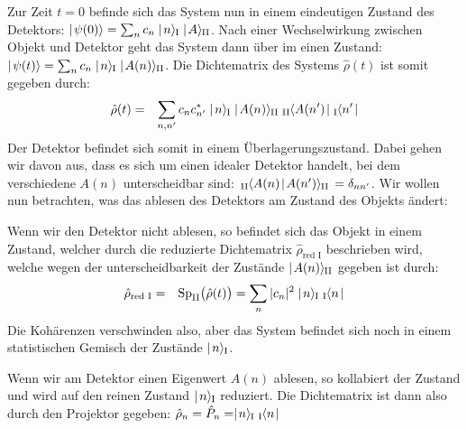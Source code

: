 Zur Zeit $t=0$ befinde sich das System nun in einem eindeutigen Zustand des Detektors: $\ket{\psi(0)}=\sum_n c_n \ketI{n}\ketII{A}$. Nach einer Wechselwirkung zwischen Objekt und Detektor geht das System dann über im einen Zustand: $\ket{\psi(t)}=\sum_n c_n \ketI{n}\ketII{A(n)}$. Die Dichtematrix des Systems $\hat{\rho}(t)$ ist somit gegeben durch: 
\begin{eqnarray*}
	\hat{\rho}(t) &=& \sum_{n,n'} c_nc^*_{n'} \ketI{n}\ketII{A(n)}\;\braII{A(n')}\braI{n'}
\end{eqnarray*}
Der Detektor befindet sich somit in einem Überlagerungszustand. Dabei gehen wir davon aus, dass es sich um einen idealer Detektor handelt, bei dem verschiedene $A(n)$ unterscheidbar sind: $\braketII{A(n)}{A(n')}=\delta_{nn'}$. Wir wollen nun betrachten, was das ablesen des Detektors am Zustand des Objekts ändert: 
\begin{itemize1}
	\item Wenn wir den Detektor nicht ablesen, so befindet sich das Objekt in einem Zustand, welcher durch die reduzierte Dichtematrix $\hat{\rho}_{\text{red I}}$ beschrieben wird, welche wegen der unterscheidbarkeit der Zustände $\mid\!\!\!\,\,{A(n)}\rangle_{\!\!\;\text{II}}$ gegeben ist durch: 
	\begin{eqnarray*} 
		\hat{\rho}_{\text{red I}} &=& \Sp_{\text{II}}\big(\hat{\rho}(t)\big) = \sum_n |c_n|^2 \ketI{n}\;\braI{n}
	\end{eqnarray*} 
	Die Kohärenzen verschwinden also, aber das System befindet sich noch in einem statistischen Gemisch der Zustände $\mid\!\!\!\,\,{n}\rangle_{\!\!\;\text{I}}$. 
	\item Wenn wir am Detektor einen Eigenwert $A(n)$ ablesen, so kollabiert der Zustand und wird auf den reinen Zustand $\mid\!\!\!\,\,{n}\rangle_{\!\!\;\text{I}}$ reduziert. Die Dichtematrix ist dann also durch den Projektor gegeben: $\hat{\rho}_n=\hat{P}_n=\ketI{n}\;\braI{n}$
\end{itemize1}
